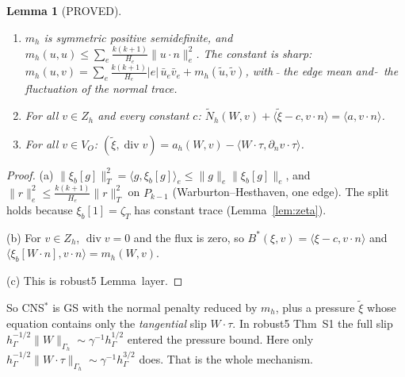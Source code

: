 \documentclass[11pt]{article}
\newtheorem{lemma}[theorem]{Lemma}
\theoremstyle{remark}
\newcommand{\hG}{h_\Gamma}
\newcommand{\Gh}{\Gamma_h}
\newcommand{\ip}[2]{\langle #1,#2\rangle}
\begin{document}
\begin{lemma}[PROVED]\label{lem:mh}
\begin{enumerate}
\item[(a)] $m_h$ is symmetric positive semidefinite, and $m_h(u,u)\le\sum_e\frac{k(k+1)}{H_e}\|u\cdot n\|_e^2$. The constant is sharp:
$m_h(u,v)=\sum_e\frac{k(k+1)}{H_e}|e|\,\bar u_e\bar v_e+m_h(\tilde u,\tilde v)$, with $\bar{\ }$ the edge mean and $\tilde{\ }$ the fluctuation of the normal trace.
\item[(b)] For all $v\in Z_h$ and every constant $c$: $\tilde N_h(W,v)+\ip{\tilde\xi-c}{v\cdot n}=\ip a{v\cdot n}$.
\item[(c)] For all $v\in V_O$: $(\tilde\xi,\operatorname{div}v)=a_h(W,v)-\ip{W\cdot\tau}{\partial_nv\cdot\tau}$.
\end{enumerate}
\end{lemma}
\begin{proof}
(a) $\|\xi_b[g]\|_T^2=\ip g{\xi_b[g]}_e\le\|g\|_e\|\xi_b[g]\|_e$, and $\|r\|_e^2\le\frac{k(k+1)}{H_e}\|r\|_T^2$ on $P_{k-1}$ (Warburton--Hesthaven, one edge).
The split holds because $\xi_b[1]=\zeta_T$ has constant trace (Lemma~\ref{lem:zeta}).

(b) For $v\in Z_h$, $\operatorname{div}v=0$ and the flux is zero, so $B^\ast(\xi,v)=\ip{\xi-c}{v\cdot n}$ and $\ip{\xi_b[W\cdot n]}{v\cdot n}=m_h(W,v)$.

(c) This is robust5 Lemma~layer.
\end{proof}

So CNS$^\ast$ is GS with the normal penalty reduced by $m_h$, plus a pressure $\tilde\xi$ whose equation contains only the \emph{tangential} slip
$W\cdot\tau$. In robust5 Thm~S1 the full slip $\hG^{-1/2}\|W\|_{\Gh}\sim\gamma^{-1}\hG^{1/2}$ entered the pressure bound. Here only
$\hG^{-1/2}\|W\cdot\tau\|_{\Gh}\sim\gamma^{-1}\hG^{3/2}$ does. That is the whole mechanism.
\end{document}
